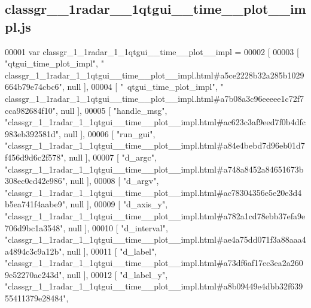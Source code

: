 \subsection{classgr\+\_\+\_\+1radar\+\_\+\_\+1qtgui\+\_\+\+\_\+time\+\_\+\+\_\+plot\+\_\+\+\_\+impl.\+js}
\label{classgr__1__1radar__1__1qtgui____time____plot____impl_8js_source}

\begin{DoxyCode}
00001 var classgr_1_1radar_1_1qtgui__time__plot__impl =
00002 [
00003     [ \textcolor{stringliteral}{"qtgui\_time\_plot\_impl"}, \textcolor{stringliteral}{"
      classgr\_1\_1radar\_1\_1qtgui\_\_time\_\_plot\_\_impl.html#a5ce2228b32a285b1029664b79e74cbc6"}, null ],
00004     [ \textcolor{stringliteral}{"~qtgui\_time\_plot\_impl"}, \textcolor{stringliteral}{"
      classgr\_1\_1radar\_1\_1qtgui\_\_time\_\_plot\_\_impl.html#a7b08a3c96eeeee1c72f7cca982684f10"}, null ],
00005     [ \textcolor{stringliteral}{"handle\_msg"}, \textcolor{stringliteral}{"classgr\_1\_1radar\_1\_1qtgui\_\_time\_\_plot\_\_impl.html#ac623c3af9eed7f0b4dfc983eb392581d"}, 
      null ],
00006     [ \textcolor{stringliteral}{"run\_gui"}, \textcolor{stringliteral}{"classgr\_1\_1radar\_1\_1qtgui\_\_time\_\_plot\_\_impl.html#a84e4bebd7d96eb01d7f456d9d6c2f578"}, null
       ],
00007     [ \textcolor{stringliteral}{"d\_argc"}, \textcolor{stringliteral}{"classgr\_1\_1radar\_1\_1qtgui\_\_time\_\_plot\_\_impl.html#a748a8452a84651673b308ec0cd42e986"}, null 
      ],
00008     [ \textcolor{stringliteral}{"d\_argv"}, \textcolor{stringliteral}{"classgr\_1\_1radar\_1\_1qtgui\_\_time\_\_plot\_\_impl.html#ac78304356e5e20e3d4b5ea741f4aabe9"}, null 
      ],
00009     [ \textcolor{stringliteral}{"d\_axis\_y"}, \textcolor{stringliteral}{"classgr\_1\_1radar\_1\_1qtgui\_\_time\_\_plot\_\_impl.html#a782a1cd78ebb37efa9e706d9bc1a3548"}, 
      null ],
00010     [ \textcolor{stringliteral}{"d\_interval"}, \textcolor{stringliteral}{"classgr\_1\_1radar\_1\_1qtgui\_\_time\_\_plot\_\_impl.html#ae4a75dd071f3a88aaa4a4894c3c9a12b"}, 
      null ],
00011     [ \textcolor{stringliteral}{"d\_label"}, \textcolor{stringliteral}{"classgr\_1\_1radar\_1\_1qtgui\_\_time\_\_plot\_\_impl.html#a73df6af17ec3ea2a2609e52270ac243d"}, null
       ],
00012     [ \textcolor{stringliteral}{"d\_label\_y"}, \textcolor{stringliteral}{"classgr\_1\_1radar\_1\_1qtgui\_\_time\_\_plot\_\_impl.html#a8b09449e4dbb32f63955411379e28484"}, 

\end{DoxyCode}
